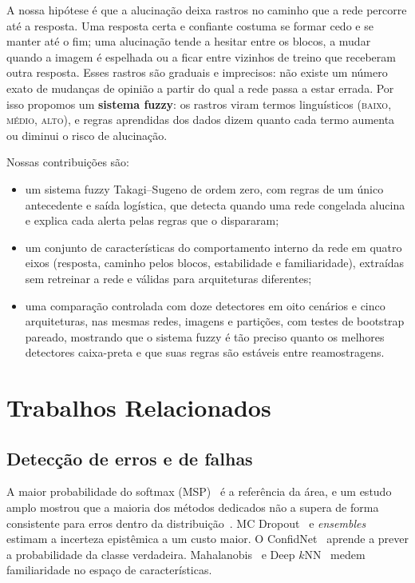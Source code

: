 \documentclass[conference,a4paper]{IEEEtran}
\newcommand{\term}[1]{\textsc{#1}}
\begin{document}
A nossa hipótese é que a alucinação deixa rastros no caminho que a rede percorre até a resposta. Uma resposta certa e confiante costuma se
formar cedo e se manter até o fim; uma alucinação tende a hesitar entre os blocos, a mudar quando a imagem é espelhada ou a ficar entre
vizinhos de treino que receberam outra resposta. Esses rastros são graduais e imprecisos: não existe um número exato de mudanças de opinião
a partir do qual a rede passa a estar errada. Por isso propomos um \textbf{sistema fuzzy}: os rastros viram termos linguísticos (\term{baixo},
\term{médio}, \term{alto}), e regras aprendidas dos dados dizem quanto cada termo aumenta ou diminui o risco de alucinação.

Nossas contribuições são:
\begin{itemize}
  \item um sistema fuzzy Takagi--Sugeno de ordem zero, com regras de um único antecedente e saída logística, que detecta quando uma rede
        congelada alucina e explica cada alerta pelas regras que o dispararam;
  \item um conjunto de características do comportamento interno da rede em quatro eixos (resposta, caminho pelos blocos, estabilidade e
        familiaridade), extraídas sem retreinar a rede e válidas para arquiteturas diferentes;
  \item uma comparação controlada com doze detectores em oito cenários e cinco arquiteturas, nas mesmas redes, imagens e partições, com
        testes de bootstrap pareado, mostrando que o sistema fuzzy é tão preciso quanto os melhores detectores caixa-preta e que suas regras
        são estáveis entre reamostragens.
\end{itemize}

\section{Trabalhos Relacionados}



\subsection{Detecção de erros e de falhas}
A maior probabilidade do softmax (MSP)~\cite{hendrycks2017} é a referência da área, e um estudo amplo mostrou que a maioria dos métodos
dedicados não a supera de forma consistente para erros dentro da distribuição~\cite{jaeger2023}. MC Dropout~\cite{gal2016} e
\textit{ensembles}~\cite{lakshminarayanan2017} estimam a incerteza epistêmica a um custo maior. O ConfidNet~\cite{corbiere2019} aprende a
prever a probabilidade da classe verdadeira. Mahalanobis~\cite{lee2018} e Deep $k$NN~\cite{papernot2018} medem familiaridade no espaço
de características.
\end{document}
